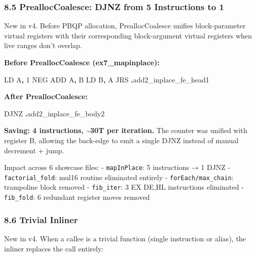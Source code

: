 \documentclass[
  11pt,
]{article}
\newenvironment{Shaded}{\begin{snugshade}}{\end{snugshade}}
\newcommand{\BuiltInTok}[1]{#1}
\newcommand{\DecValTok}[1]{\textcolor[rgb]{0.00,0.00,0.81}{#1}}
\newcommand{\NormalTok}[1]{#1}
\newcommand{\OperatorTok}[1]{\textcolor[rgb]{0.81,0.36,0.00}{\textbf{#1}}}
\begin{document}
\hypertarget{prealloccoalesce-djnz-from-5-instructions-to-1}{%
\subsubsection{8.5 PreallocCoalesce: DJNZ from 5 Instructions to
1}\label{prealloccoalesce-djnz-from-5-instructions-to-1}}

New in v4. Before PBQP allocation, PreallocCoalesce unifies
block-parameter virtual registers with their corresponding
block-argument virtual registers when live ranges don't overlap.

\textbf{Before PreallocCoalesce (ex7\_mapinplace):}

\begin{Shaded}
\begin{Highlighting}[]
\NormalTok{    LD A}\OperatorTok{,} \DecValTok{1}
    \BuiltInTok{NEG}
    \BuiltInTok{ADD}\NormalTok{ A}\OperatorTok{,}\NormalTok{ B}
\NormalTok{    LD B}\OperatorTok{,}\NormalTok{ A}
\NormalTok{    JRS }\OperatorTok{.}\NormalTok{add2\_inplace\_fe\_head1}
\end{Highlighting}
\end{Shaded}

\textbf{After PreallocCoalesce:}

\begin{Shaded}
\begin{Highlighting}[]
\NormalTok{    DJNZ }\OperatorTok{.}\NormalTok{add2\_inplace\_fe\_body2}
\end{Highlighting}
\end{Shaded}

\textbf{Saving: 4 instructions, \textasciitilde30T per iteration.} The
counter was unified with register B, allowing the back-edge to emit a
single DJNZ instead of manual decrement + jump.

Impact across 6 showcase files: - \texttt{mapInPlace}: 5 instructions →
1 DJNZ - \texttt{factorial\_fold}: mul16 routine eliminated entirely -
\texttt{forEach/max\_chain}: trampoline block removed -
\texttt{fib\_iter}: 3 EX DE,HL instructions eliminated -
\texttt{fib\_fold}: 6 redundant register moves removed

\hypertarget{trivial-inliner}{%
\subsubsection{8.6 Trivial Inliner}\label{trivial-inliner}}

New in v4. When a callee is a trivial function (single instruction or
alias), the inliner replaces the call entirely:
\end{document}
